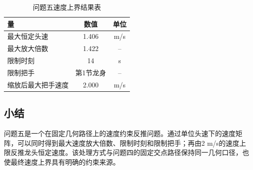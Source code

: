 \begin{table}[H]
\centering
\caption{问题五速度上界结果表}
\label{tab:q5-result}
\begin{tabularx}{0.86\textwidth}{LCC}
\toprule
量 & 数值 & 单位\\
\midrule
最大恒定头速 & 1.406 & m/s\\
最大放大倍数 & 1.422 & --\\
限制时刻 & 14 & s\\
限制把手 & 第1节龙身 & --\\
缩放后最大把手速度 & 2.000 & m/s\\
\bottomrule
\end{tabularx}
\end{table}

\subsection{小结}
问题五是一个在固定几何路径上的速度约束反推问题。通过单位头速下的速度矩阵，可以同时得到最大速度放大倍数、限制时刻和限制把手；再由2 m/s的速度上限反推龙头恒定速度。该处理方式与问题四的固定交点路径保持同一几何口径，也使最终速度上界具有明确的约束来源。
